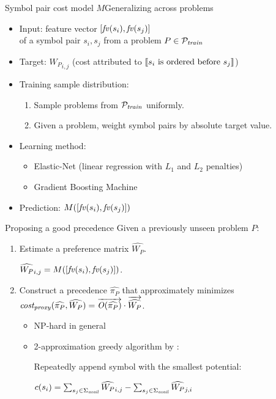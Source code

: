 \documentclass[notes]{beamer}
\begin{document}
\begin{frame}{Symbol pair cost model $M$}{Generalizing across problems}
\begin{itemize}
	\item Input: feature vector $[\mathit{fv}(s_i), \mathit{fv}(s_j)]$ \\
	of a symbol pair $s_i, s_j$
	from a problem $P \in \mathcal{P}_{\mathit{train}}$
	\item Target: ${W_P}_{i,j}$ (cost attributed to $\left \llbracket s_i\text{ is ordered before }s_j \right \rrbracket$)
	\item Training sample distribution:
	\begin{enumerate}
		\item Sample problems from $\mathcal{P}_{\mathit{train}}$ uniformly.
		\item Given a problem, weight symbol pairs by absolute target value.
	\end{enumerate}
	\item Learning method:
	\begin{itemize}
		\item Elastic-Net (linear regression with $L_1$ and $L_2$ penalties)
		\item Gradient Boosting Machine
	\end{itemize}
	\item Prediction: $M([\mathit{fv}(s_i), \mathit{fv}(s_j)])$
\end{itemize}
\end{frame}

\begin{frame}{Proposing a good precedence}
Given a previously unseen problem $P$:
\begin{enumerate}
	\item Estimate a preference matrix $\widehat{W_P}$.
	
	$\widehat{W_P}_{i,j} = M([\mathit{fv}(s_i), \mathit{fv}(s_j)])$.
	\item Construct a precedence \(\widehat{\pi_P}\) that approximately minimizes
	$\operatorname{\mathit{cost_{proxy}}}(\widehat{\pi_P}, \widehat{W_P}) = \overrightarrow{\operatorname{\mathit{O}}(\widehat{\pi_P})} \cdot \overrightarrow{\widehat{W_P}}$.
	\begin{itemize}
		\item NP-hard in general
		\item 2-approximation greedy algorithm by \citet{Cohen2011}:
		
		Repeatedly append symbol with the smallest potential:
		
		$c(s_i) = \sum_{s_j \in \operatorname{\Sigma}_{\mathit{avail}}} \widehat{W_P}_{i, j} - \sum_{s_j \in \operatorname{\Sigma}_{\mathit{avail}}} \widehat{W_P}_{j, i}$
	\end{itemize}
\end{enumerate}
\end{frame}
\end{document}
